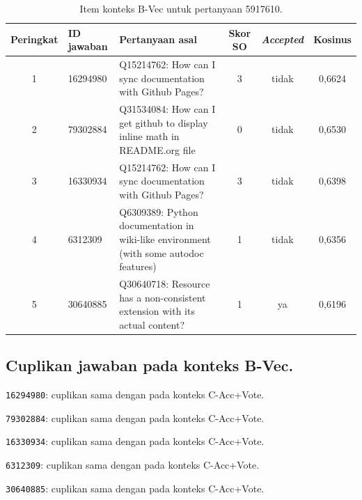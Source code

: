 \begin{table}[!htbp]
\centering
\scriptsize
\caption{Item konteks B-Vec untuk pertanyaan 5917610.}
\label{tab:lamp-y-konteks-b}
\renewcommand{\arraystretch}{1.25}
\begin{tabularx}{\textwidth}{|c|l|>{\raggedright\arraybackslash}X|c|c|c|}
\hline
\textbf{Peringkat} & \textbf{ID jawaban} & \textbf{Pertanyaan asal} & \textbf{Skor SO} & \textbf{\emph{Accepted}} & \textbf{Kosinus} \\
\hline
1 & 16294980 & Q15214762: How can I sync documentation with Github Pages? & 3 & tidak & 0,6624 \\
\hline
2 & 79302884 & Q31534084: How can I get github to display inline math in README.org file & 0 & tidak & 0,6530 \\
\hline
3 & 16330934 & Q15214762: How can I sync documentation with Github Pages? & 3 & tidak & 0,6398 \\
\hline
4 & 6312309 & Q6309389: Python documentation in wiki-like environment (with some autodoc features) & 1 & tidak & 0,6356 \\
\hline
5 & 30640885 & Q30640718: Resource has a non-consistent extension with its actual content? & 1 & ya & 0,6196 \\
\hline
\end{tabularx}
\end{table}
\subsection{Cuplikan jawaban pada konteks B-Vec.}
\begin{description}\small
\item[1.] \texttt{16294980}: cuplikan sama dengan pada konteks C-Acc+Vote.
\item[2.] \texttt{79302884}: cuplikan sama dengan pada konteks C-Acc+Vote.
\item[3.] \texttt{16330934}: cuplikan sama dengan pada konteks C-Acc+Vote.
\item[4.] \texttt{6312309}: cuplikan sama dengan pada konteks C-Acc+Vote.
\item[5.] \texttt{30640885}: cuplikan sama dengan pada konteks C-Acc+Vote.
\end{description}


